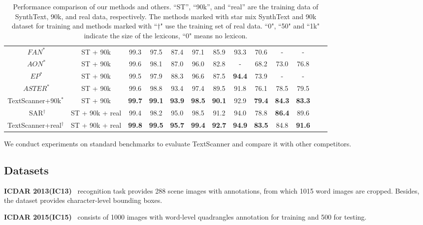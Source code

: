 \documentclass[letterpaper]{article} \usepackage{aaai20}  \usepackage{times}  \usepackage{helvet} \usepackage{courier}  \usepackage[hyphens]{url}  \usepackage{graphicx} \urlstyle{rm} \def\UrlFont{\rm}  \usepackage{graphicx}  \frenchspacing  \setlength{\pdfpagewidth}{8.5in}  \setlength{\pdfpageheight}{11in}
\begin{document}
\begin{table*}[t]
\begin{center}
\begin{tabular}{|c|c|c|c|c|c|c|c|c|c|c|c|c|}
        $~FAN^{\ast}$\text{\tiny\cite{cheng2017fan}} & ST + 90k & 99.3 & 97.5 & 87.4 & 97.1 & 85.9 & 93.3 & 70.6 & - & - \\
        $~AON^{\ast}$\text{\tiny\cite{aon}} & ST + 90k & 99.6 & 98.1 & 87.0 & 96.0 & 82.8 & - & 68.2 & 73.0 & 76.8 \\
        $~EP^{\ast}$\text{\tiny\cite{bai2018edit}} & ST + 90k & 99.5 & 97.9 & 88.3 & 96.6 & 87.5 & \textbf{94.4} & 73.9 & - & - \\
        $~ASTER^{\ast }$\text{\tiny\cite{aster}} & ST + 90k & 99.6 & 98.8 & 93.4 & 97.4 & 89.5 & 91.8 & 76.1 & 78.5 & 79.5 \\
        \hline
        TextScanner+90k$^{\ast }$ & ST + 90k & \textbf{99.7} & \textbf{99.1} & \textbf{93.9} & \textbf{98.5} & \textbf{90.1} & 92.9 & \textbf{79.4} & \textbf{84.3} & \textbf{83.3}  \\ 
        \hline
        \hline
        ~SAR$^\dagger$\text{\tiny\cite{li2019show}} & ST + 90k + real & 99.4 & 98.2 & 95.0 & 98.5 & 91.2 & 94.0 & 78.8 & \textbf{86.4} & 89.6 \\
        \hline
        TextScanner+real$^\dagger$ & ST + 90k + real & \textbf{99.8} & \textbf{99.5} & \textbf{95.7} & \textbf{99.4} & \textbf{92.7} & \textbf{94.9} & \textbf{83.5} & 84.8 & \textbf{91.6} \\
    \hline
    \end{tabular}
    \end{center}
    \caption{Performance comparison of our methods and others. ``ST'', ``90k'', and ``real'' are the training data of SynthText, 90k, and real data, respectively.
    The methods marked with star mix SynthText and 90k dataset for training and methods marked with ``$\dagger$" use the training set of real data. ``0", ``50" and ``1k" indicate the size of the lexicons, ``0" means no lexicon.}
    \label{tab:performance}
\end{table*} \label{performance}

We conduct experiments on standard benchmarks to evaluate TextScanner and compare it with other competitors.
\subsection{Datasets} \label{datasets}
\textbf{ICDAR 2013(IC13)}~\cite{ic13} recognition task provides 288 scene images with annotations, from which 1015 word images are cropped. Besides, the dataset provides character-level bounding boxes.

\noindent\textbf{ICDAR 2015(IC15)}~\cite{karatzas2015icdar}
consists of 1000 images with word-level quadrangles annotation for training and 500 for testing.
\end{document}
